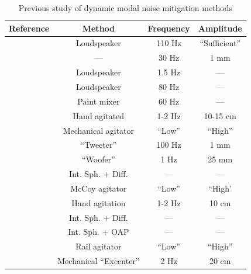 \documentclass[twocolumn]{emulateapj}
\begin{document}
\begin{table}
\centering
\caption{Previous study of dynamic modal noise mitigation methods}
	\begin{tabular}{cccc}
		\hline
		Reference & Method & Frequency & Amplitude \\
		\hline\hline
		\cite{Daino1980} & Loudspeaker & 110 Hz & ``Sufficient'' \\
		\hline
		\cite{Baudrand2001} & --- & 30 Hz & 1 mm \\
		\hline
		\multirow{2}{*}{\cite{Lemke2011}} & Loudspeaker & 1.5 Hz & --- \\
		 & Loudspeaker & 80 Hz & --- \\
		\hline
		\multirow{3}{*}{\cite{McCoy2012}} & Paint mixer & 60 Hz & --- \\
		 & Hand agitated & 1-2 Hz & 10-15 cm \\
		 & Mechanical agitator & ``Low'' & ``High''\\
		\hline
		\multirow{2}{*}{\cite{Plavchan2013}} & ``Tweeter'' & 100 Hz & 1 mm \\
		 & ``Woofer'' & 1 Hz & 25 mm \\
		\hline
		\multirow{3}{*}{\cite{Mahadevan2014}} & Int. Sph. + Diff. & --- & ---\\
		 & McCoy agitator & ``Low'' & ``High' \\
		 & Hand agitation & 1-2 Hz & 10 cm \\
		\hline
		\multirow{2}{*}{\cite{Halverson2014}} & Int. Sph. + Diff. & --- & --- \\
		 & Int. Sph. + OAP & --- & --- \\
		\hline		
		\cite{Roy2014} & Rail agitator & ``Low'' & ``High'' \\
		\hline
		\cite{Sablowski2015} & Mechanical ``Excenter''& 2 Hz & 20 cm \\
		\hline
	\end{tabular}
\label{table:previous_studies}
\end{table}
\end{document}
